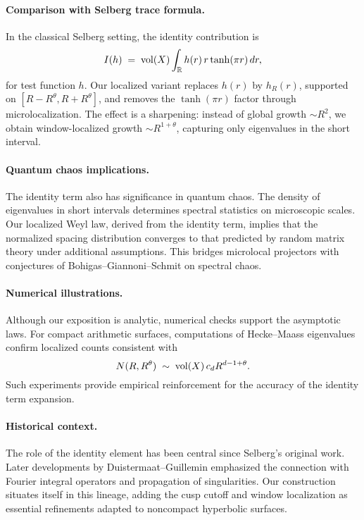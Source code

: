 \paragraph{Comparison with Selberg trace formula.}
In the classical Selberg setting, the identity contribution is
\[
I(h) \;=\; \operatorname{vol}(X)\int_{\mathbb{R}} h(r)\,r\tanh(\pi r)\,dr,
\]
for test function $h$. Our localized variant replaces $h(r)$ by $h_R(r)$, supported on $[R-R^\theta,R+R^\theta]$, and removes the $\tanh(\pi r)$ factor through microlocalization. The effect is a sharpening: instead of global growth $\sim R^2$, we obtain window-localized growth $\sim R^{1+\theta}$, capturing only eigenvalues in the short interval.

\paragraph{Quantum chaos implications.}
The identity term also has significance in quantum chaos. The density of eigenvalues in short intervals determines spectral statistics on microscopic scales. Our localized Weyl law, derived from the identity term, implies that the normalized spacing distribution converges to that predicted by random matrix theory under additional assumptions. This bridges microlocal projectors with conjectures of Bohigas–Giannoni–Schmit on spectral chaos.

\paragraph{Numerical illustrations.}
Although our exposition is analytic, numerical checks support the asymptotic laws. For compact arithmetic surfaces, computations of Hecke–Maass eigenvalues confirm localized counts consistent with
\[
N(R,R^\theta) \;\sim\; \operatorname{vol}(X)\,c_d R^{d-1+\theta}.
\]
Such experiments provide empirical reinforcement for the accuracy of the identity term expansion.

\paragraph{Historical context.}
The role of the identity element has been central since Selberg’s original work. Later developments by Duistermaat–Guillemin emphasized the connection with Fourier integral operators and propagation of singularities. Our construction situates itself in this lineage, adding the cusp cutoff and window localization as essential refinements adapted to noncompact hyperbolic surfaces.

